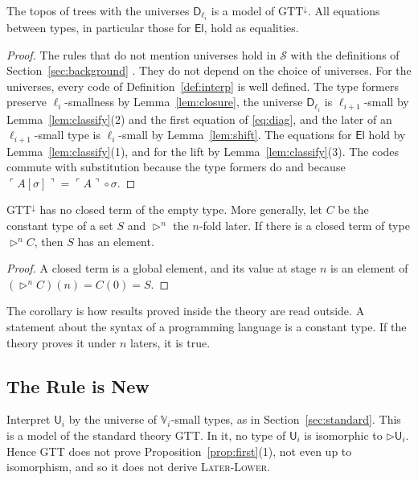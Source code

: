 \documentclass[acmsmall,nonacm,screen]{acmart}
\newcommand{\later}{{\triangleright}}
\newcommand{\Uv}{\mathsf{U}}
\newcommand{\El}{\mathsf{El}}
\newcommand{\Vg}{\mathbb{V}}
\newcommand{\Dg}{\mathsf{D}}
\newcommand{\Tr}{\mathcal{S}}
\begin{document}
\begin{theorem}[Soundness]\label{thm:sound}
The topos of trees with the universes $\Dg_{\ell_i}$ is a model of
$\mathrm{GTT}^{\downarrow}$. All equations between types, in particular those for $\El$,
hold as equalities.
\end{theorem}

\begin{proof}
The rules that do not mention universes hold in $\Tr$ with the definitions of
Section~\ref{sec:background} \citep{BMSS2012,gDTT2016}. They do not depend on the choice of
universes. For the universes, every code of Definition~\ref{def:interp} is well defined. The
type formers preserve $\ell_i$-smallness by Lemma~\ref{lem:closure}, the universe
$\Dg_{\ell_i}$ is $\ell_{i+1}$-small by Lemma~\ref{lem:classify}(2) and the first equation
of \eqref{eq:diag}, and the later of an $\ell_{i+1}$-small type is $\ell_i$-small by
Lemma~\ref{lem:shift}. The equations for $\El$ hold by Lemma~\ref{lem:classify}(1), and for
the lift by Lemma~\ref{lem:classify}(3). The codes commute with substitution because the
type formers do and because
$\ulcorner A[\sigma] \urcorner = \ulcorner A \urcorner \circ \sigma$.
\end{proof}

\begin{corollary}\label{cor:adequate}
$\mathrm{GTT}^{\downarrow}$ has no closed term of the empty type. More generally, let $C$ be
the constant type of a set $S$ and $\later^n$ the $n$-fold later. If there is a closed term
of type $\later^n C$, then $S$ has an element.
\end{corollary}

\begin{proof}
A closed term is a global element, and its value at stage $n$ is an element of
$(\later^n C)(n) = C(0) = S$.
\end{proof}

The corollary is how results proved inside the theory are read outside. A statement about
the syntax of a programming language is a constant type. If the theory proves it under $n$
laters, it is true.

\subsection{The Rule is New}

\begin{proposition}[Independence]\label{prop:independent}
Interpret $\Uv_i$ by the universe of $\Vg_i$-small types, as in
Section~\ref{sec:standard}. This is a model of the standard theory GTT. In it, no type of
$\Uv_i$ is isomorphic to $\later\Uv_i$. Hence GTT does not prove
Proposition~\ref{prop:first}(1), not even up to isomorphism, and so it does not derive
\textsc{Later-Lower}.
\end{proposition}
\end{document}
